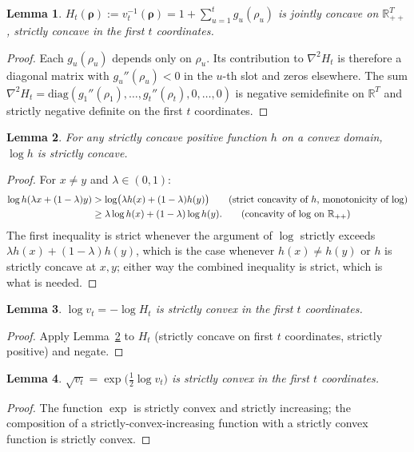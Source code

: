 \documentclass{article}
\newtheorem{lemma}{Lemma}
\begin{document}
\begin{lemma}
    $H_t(\boldsymbol{\rho}) := v_t^{-1}(\boldsymbol{\rho}) = 1 + \sum_{u=1}^t g_u(\rho_u)$ is jointly concave on $\mathbb{R}_{++}^T$, strictly concave in the first $t$ coordinates.
\end{lemma}

\begin{proof}
    Each $g_u(\rho_u)$ depends only on $\rho_u$. Its contribution to $\nabla^2 H_t$ is therefore a diagonal matrix with $g_u''(\rho_u) < 0$ in the $u$-th slot and zeros elsewhere. The sum $\nabla^2 H_t = \mathrm{diag}(g_1''(\rho_1), \ldots, g_t''(\rho_t), 0, \ldots, 0)$ is negative semidefinite on $\mathbb{R}^T$ and strictly negative definite on the first $t$ coordinates.
\end{proof}

\begin{lemma}
\label{lem:log_h_convex}
    For any strictly concave positive function $h$ on a convex domain, $\log h$ is strictly concave.
\end{lemma}

\begin{proof}
    For $x \ne y$ and $\lambda \in (0,1)$:
\begin{align*}
\log h(\lambda x + (1-\lambda)y) &> \log\!\big(\lambda h(x) + (1-\lambda)h(y)\big) \tag{strict concavity of $h$, monotonicity of $\log$} \\
&\ge \lambda\log h(x) + (1-\lambda)\log h(y). \tag{concavity of $\log$ on $\mathbb{R}_{++}$}
\end{align*}
The first inequality is strict whenever the argument of $\log$ strictly exceeds $\lambda h(x) + (1-\lambda)h(y)$, which is the case whenever $h(x) \ne h(y)$ or $h$ is strictly concave at $x, y$; either way the combined inequality is strict, which is what is needed.
\end{proof}

\begin{lemma}
    $\log v_t = -\log H_t$ is strictly convex in the first $t$ coordinates.
\end{lemma}

\begin{proof}
    Apply Lemma~\ref{lem:log_h_convex} to $H_t$ (strictly concave on first $t$ coordinates, strictly positive) and negate.
\end{proof}


\begin{lemma}
\label{lem:v_t_convex}
$\sqrt{v_t} = \exp\!\big(\tfrac{1}{2}\log v_t\big)$ is strictly convex in the first $t$ coordinates.
\end{lemma}
\begin{proof}
The function $\exp$ is strictly convex and strictly increasing; the composition of a strictly-convex-increasing function with a strictly convex function is strictly convex.
\end{proof}
\end{document}

